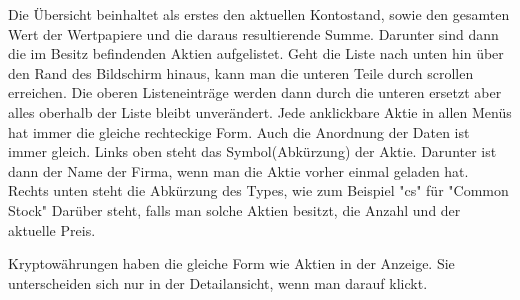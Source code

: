 \documentclass[10pt]{scrartcl}
\begin{document}
Die Übersicht beinhaltet als erstes den aktuellen Kontostand, sowie den gesamten Wert der Wertpapiere und die daraus resultierende Summe. Darunter sind dann die im Besitz befindenden Aktien aufgelistet. Geht die Liste nach unten hin über den Rand des Bildschirm hinaus, kann man die unteren Teile durch scrollen erreichen. Die oberen Listeneinträge werden dann durch die unteren ersetzt aber alles oberhalb der Liste bleibt unverändert.
Jede anklickbare Aktie in allen Menüs hat immer die gleiche rechteckige Form. Auch die Anordnung der Daten ist immer gleich. Links oben steht das Symbol(Abkürzung) der Aktie. Darunter ist dann der Name der Firma, wenn man die Aktie vorher einmal geladen hat. Rechts unten steht die Abkürzung des Types, wie zum Beispiel "cs" für "Common Stock" Darüber steht, falls man solche Aktien besitzt, die Anzahl und der aktuelle Preis.

Kryptowährungen haben die gleiche Form wie Aktien in der Anzeige. Sie unterscheiden sich nur in der Detailansicht, wenn man darauf klickt.
\end{document}
